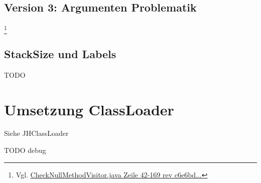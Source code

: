 \subsection{Version 3: Argumenten Problematik}

\footnote{Vgl. \href{https://github.com/jerolimov/java-hardener/blob/c6e6bdc7d081eae5e47d2c926073aa3715d908f6/src/main/java/de/fhkoeln/gm/cui/javahardener/CheckNullMethodVisitor.java\#L42-169}{CheckNullMethodVisitor.java Zeile 42-169 rev c6e6bd...}}

\subsection{StackSize und Labels}

TODO

\section{Umsetzung ClassLoader}

Siehe JHClassLoader

TODO debug


